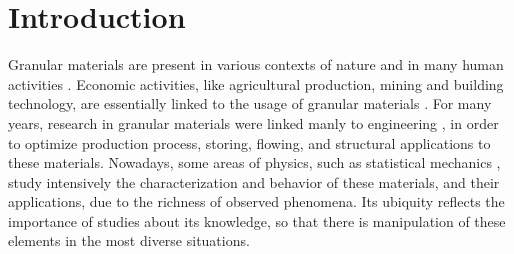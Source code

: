 
\chapter{Introduction}
\label{chap:Introducao}


    Granular materials are present in various contexts of nature and in many human activities \cite{Granular_Media_Between_Fluid_and_Solid, Sands_Powders_and_Grains, The_Physics_of_Granular_Media, Granular_Physics, Micromechanics_of_Granular_Materials}. Economic activities, like agricultural production, mining and building technology, are essentially linked to the usage of granular materials \cite{Sands_Powders_and_Grains}. For many years, research in granular materials were linked manly to engineering \cite{Abraao-Dissertacao, Versuche_uber_Getreidedruck_in_Silozellen, Janssen}, in order to optimize production process, storing, flowing, and structural applications to these materials. Nowadays, some areas of physics, such as statistical mechanics \cite{Unifying_Concepts_in_Granular_Media_and_Glasses}, study intensively the characterization and behavior of these materials, and their applications, due to the richness of observed phenomena. Its ubiquity reflects the importance of studies about its knowledge, so that there is manipulation of these elements in the most diverse situations.

